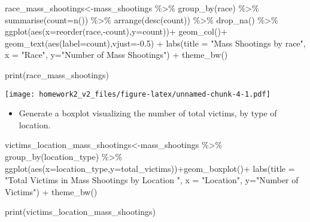 \documentclass[
]{article}
\newenvironment{Shaded}{\begin{snugshade}}{\end{snugshade}}
\newcommand{\AttributeTok}[1]{\textcolor[rgb]{0.77,0.63,0.00}{#1}}
\newcommand{\FloatTok}[1]{\textcolor[rgb]{0.00,0.00,0.81}{#1}}
\newcommand{\FunctionTok}[1]{\textcolor[rgb]{0.00,0.00,0.00}{#1}}
\newcommand{\NormalTok}[1]{#1}
\newcommand{\OtherTok}[1]{\textcolor[rgb]{0.56,0.35,0.01}{#1}}
\newcommand{\SpecialCharTok}[1]{\textcolor[rgb]{0.00,0.00,0.00}{#1}}
\newcommand{\StringTok}[1]{\textcolor[rgb]{0.31,0.60,0.02}{#1}}
\providecommand{\tightlist}{%
  \setlength{\itemsep}{0pt}\setlength{\parskip}{0pt}}
\begin{document}
\begin{Shaded}
\begin{Highlighting}[]
\NormalTok{race\_mass\_shootings}\OtherTok{\textless{}{-}}\NormalTok{mass\_shootings }\SpecialCharTok{\%\textgreater{}\%}
  \FunctionTok{group\_by}\NormalTok{(race) }\SpecialCharTok{\%\textgreater{}\%} 
  \FunctionTok{summarise}\NormalTok{(}\AttributeTok{count=}\FunctionTok{n}\NormalTok{()) }\SpecialCharTok{\%\textgreater{}\%} 
  \FunctionTok{arrange}\NormalTok{(}\FunctionTok{desc}\NormalTok{(count)) }\SpecialCharTok{\%\textgreater{}\%} 
  \FunctionTok{drop\_na}\NormalTok{() }\SpecialCharTok{\%\textgreater{}\%} 
  \FunctionTok{ggplot}\NormalTok{(}\FunctionTok{aes}\NormalTok{(}\AttributeTok{x=}\FunctionTok{reorder}\NormalTok{(race,}\SpecialCharTok{{-}}\NormalTok{count),}\AttributeTok{y=}\NormalTok{count))}\SpecialCharTok{+}
  \FunctionTok{geom\_col}\NormalTok{()}\SpecialCharTok{+} 
  \FunctionTok{geom\_text}\NormalTok{(}\FunctionTok{aes}\NormalTok{(}\AttributeTok{label=}\NormalTok{count),}\AttributeTok{vjust=}\SpecialCharTok{{-}}\FloatTok{0.5}\NormalTok{) }\SpecialCharTok{+}
  \FunctionTok{labs}\NormalTok{(}\AttributeTok{title =} \StringTok{"Mass Shootings by race"}\NormalTok{,}
       \AttributeTok{x =} \StringTok{"Race"}\NormalTok{, }\AttributeTok{y=}\StringTok{"Number of Mass Shootings"}\NormalTok{) }\SpecialCharTok{+}
  \FunctionTok{theme\_bw}\NormalTok{()}

\FunctionTok{print}\NormalTok{(race\_mass\_shootings)}
\end{Highlighting}
\end{Shaded}

\texttt{[image: homework2\_v2\_files/figure-latex/unnamed-chunk-4-1.pdf]}

\begin{itemize}
\tightlist
\item
  Generate a boxplot visualizing the number of total victims, by type of
  location.
\end{itemize}

\begin{Shaded}
\begin{Highlighting}[]
\NormalTok{victims\_location\_mass\_shootings}\OtherTok{\textless{}{-}}\NormalTok{mass\_shootings }\SpecialCharTok{\%\textgreater{}\%} 
  \FunctionTok{group\_by}\NormalTok{(location\_type) }\SpecialCharTok{\%\textgreater{}\%} 
  \FunctionTok{ggplot}\NormalTok{(}\FunctionTok{aes}\NormalTok{(}\AttributeTok{x=}\NormalTok{location\_type,}\AttributeTok{y=}\NormalTok{total\_victims))}\SpecialCharTok{+}\FunctionTok{geom\_boxplot}\NormalTok{()}\SpecialCharTok{+}
\FunctionTok{labs}\NormalTok{(}\AttributeTok{title =} \StringTok{"Total Victims in Mass Shootings by Location "}\NormalTok{,}
       \AttributeTok{x =} \StringTok{"Location"}\NormalTok{, }\AttributeTok{y=}\StringTok{"Number of Victims"}\NormalTok{) }\SpecialCharTok{+}
  \FunctionTok{theme\_bw}\NormalTok{() }

\FunctionTok{print}\NormalTok{(victims\_location\_mass\_shootings)}
\end{Highlighting}
\end{Shaded}
\end{document}
